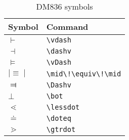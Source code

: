 \documentclass[a4paper]{article}
\begin{document}
\begin{table}
	\centering
	\begin{tabular}{ll}
		\hline
		\textbf{Symbol} & \textbf{Command} \\
		\hline
		$\vdash$ 	& \texttt{\textbackslash vdash} \\
		$\dashv$ 	& \texttt{\textbackslash dashv} \\
		$\vDash$ 	& \texttt{\textbackslash vDash} \\
		$\mid\!\equiv\!\mid$ & \texttt{\textbackslash mid\textbackslash!\textbackslash equiv\textbackslash!\textbackslash mid} \\
		$\Dashv$ 	& \texttt{\textbackslash Dashv} \\
		$\bot$		& \texttt{\textbackslash bot} \\
		$\lessdot$ 	& \texttt{\textbackslash lessdot} \\
		$\doteq$	& \texttt{\textbackslash doteq} \\
		$\gtrdot $	& \texttt{\textbackslash gtrdot} \\
		\hline
	\end{tabular}
	\caption{DM836 symbols}
	\label{tab:dm836symbols}
\end{table}
\end{document}
